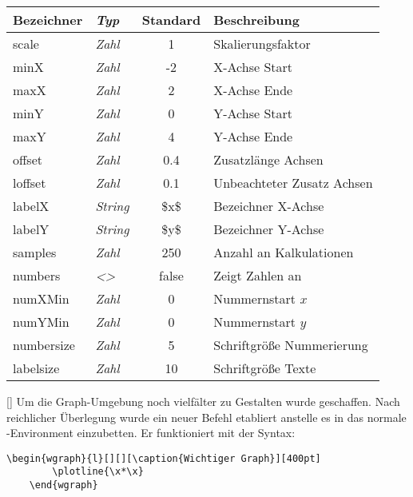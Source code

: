 \begin{center}%
    \begin{tabular}{>{\LILLYxlstTypeWriter}l>{\em}lcl}
        \toprule
        Bezeichner & \normalfont Typ & Standard & Beschreibung\\\midrule
        scale & Zahl & 1 & Skalierungsfaktor \\
        minX & Zahl & -2 & X-Achse Start \\
        maxX & Zahl & 2 & X-Achse Ende \\
        minY & Zahl & 0 & Y-Achse Start \\
        maxY & Zahl & 4 & Y-Achse Ende \\
        offset & Zahl & 0.4 & Zusatzlänge Achsen \\
        loffset & Zahl & 0.1 & Unbeachteter Zusatz Achsen\\
        labelX & String & \$x\$ & Bezeichner X-Achse \\
        labelY & String & \$y\$ & Bezeichner Y-Achse \\
        samples & Zahl & 250 & Anzahl an Kalkulationen \\
        numbers & <> & false & Zeigt Zahlen an \\
        numXMin & Zahl & 0 & Nummernstart $x$ \\
        numYMin & Zahl & 0 & Nummernstart $y$ \\
        numbersize & Zahl & 5 & Schriftgröße Nummerierung \\
        labelsize & Zahl & 10 & Schriftgröße Texte \\
        \bottomrule
    \end{tabular}
\end{center}

[\secline{}]
Um die Graph-Umgebung noch vielfälter zu Gestalten wurde  geschaffen.
Nach reichlicher Überlegung wurde ein neuer Befehl etabliert anstelle es in das
normale -Environment einzubetten. Er funktioniert mit der Syntax:
\begin{lstlisting}[language=lLatex,frame=none,breaklines=true]
    \begin{wgraph}{l}[][][\caption{Wichtiger Graph}][400pt]
        \plotline{\x*\x}
    \end{wgraph}
\end{lstlisting}
%
%
%
%
%
%
%
%
%
